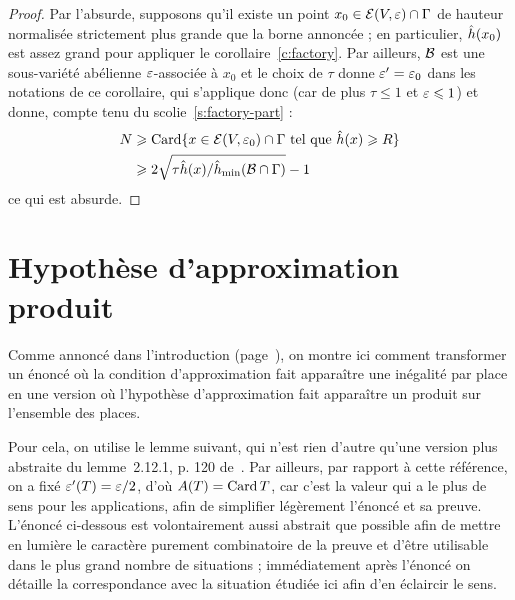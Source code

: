 \begin{proof}
  Par l'absurde, supposons qu'il existe un point
  \( x_0 \in \mathcal E(V, \varepsilon) \cap \Gamma \) de hauteur
  normalisée strictement plus grande que la borne annoncée ; en particulier,
  \( \hat h ( x_0 ) \) est assez grand pour appliquer le
  corollaire~\vref{c:factory}. Par ailleurs, \( \mathcal B \) est une sous-variété
  abélienne \( \varepsilon \)-associée à \( x_0 \) et le choix de \( \tau \) donne
  \( \varepsilon' = \varepsilon_0 \) dans les notations de ce corollaire, qui s'applique
  donc (car de plus \( \tau \le 1 \) et \( \varepsilon \leqslant 1 \)) et donne, compte
  tenu du scolie~\vref{s:factory-part} :
  \begin{align}
    N
    & \geqslant
    \operatorname{Card}
    \lbrace
      x \in \mathcal E(V, \varepsilon_0) \cap \Gamma
      \text{ tel que }
      \hat h (x) \geqslant R
    \rbrace
    \\ & \geqslant
    2 \sqrt{ \tau \hat h (x) / \hat h_{\mathrm{min}}(\mathcal B \cap \Gamma) } - 1
  \end{align}
  ce qui est absurde.
\end{proof}



\section{Hypothèse d'approximation produit}
\label{sec:ha-prod}

Comme annoncé dans l'introduction (page~\pageref{e:ha-prod}), on montre ici
comment transformer un énoncé où la condition d'approximation fait apparaître
une inégalité par place en une version où l'hypothèse d'approximation fait
apparaître un produit sur l'ensemble des places.

Pour cela, on utilise le lemme suivant, qui n'est rien d'autre qu'une version
plus abstraite du lemme~2.12.1, p. 120 de~\cite{farhith}. Par ailleurs, par
rapport à cette référence, on a fixé \( \varepsilon'(T) = \varepsilon/2 \), d'où \( A(T) =
  \operatorname{Card} T \), car c'est la valeur qui a le plus de sens pour les applications,
afin de simplifier légèrement l'énoncé et sa preuve. L'énoncé ci-dessous est
volontairement aussi abstrait que possible afin de mettre en lumière le
caractère purement combinatoire de la preuve et d'être utilisable dans le plus
grand nombre de situations ; immédiatement après l'énoncé on détaille la
correspondance avec la situation étudiée ici afin d'en éclaircir le sens.

